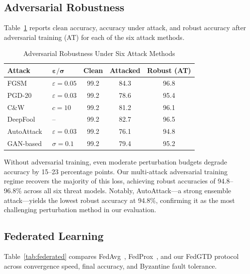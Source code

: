 \subsection{Adversarial Robustness}

Table~\ref{tab:adversarial} reports clean accuracy, accuracy under attack, and robust accuracy after adversarial training (AT) for each of the six attack methods.

\begin{table}[!t]
\centering
\caption{Adversarial Robustness Under Six Attack Methods}
\label{tab:adversarial}
\renewcommand{\arraystretch}{1.15}
\begin{tabular}{@{}llccc@{}}
\toprule
\textbf{Attack} & $\boldsymbol{\varepsilon / \sigma}$ & \textbf{Clean} & \textbf{Attacked} & \textbf{Robust (AT)} \\
\midrule
FGSM~\cite{Goodfellow2015}   & $\varepsilon{=}0.05$ & 99.2 & 84.3 & 96.8 \\
PGD-20~\cite{Madry2018}      & $\varepsilon{=}0.03$ & 99.2 & 78.6 & 95.4 \\
C\&W~\cite{Carlini2017}      & $c{=}10$             & 99.2 & 81.2 & 96.1 \\
DeepFool~\cite{Moosavi2016}  & --                   & 99.2 & 82.7 & 96.5 \\
AutoAttack~\cite{Croce2020}  & $\varepsilon{=}0.03$ & 99.2 & 76.1 & 94.8 \\
GAN-based~\cite{Lin2022}     & $\sigma{=}0.1$       & 99.2 & 79.4 & 95.2 \\
\bottomrule
\end{tabular}
\end{table}

Without adversarial training, even moderate perturbation budgets degrade accuracy by 15--23 percentage points. Our multi-attack adversarial training regime recovers the majority of this loss, achieving robust accuracies of 94.8--96.8\% across all six threat models. Notably, AutoAttack---a strong ensemble attack---yields the lowest robust accuracy at 94.8\%, confirming it as the most challenging perturbation method in our evaluation.

\subsection{Federated Learning}

Table~\ref{tab:federated} compares FedAvg~\cite{McMahan2017}, FedProx~\cite{Li2020FedProx}, and our FedGTD protocol across convergence speed, final accuracy, and Byzantine fault tolerance.

